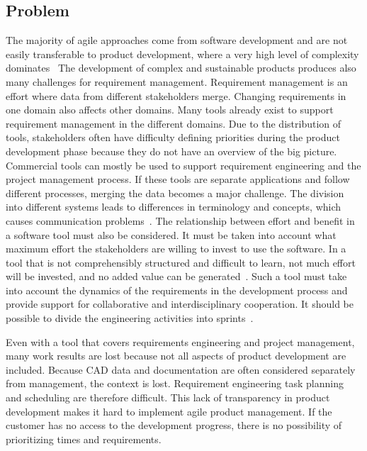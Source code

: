     
    
    \subsection*{Problem}
    The majority of agile approaches come from software development and are not easily transferable to product development, where a very high level of complexity dominates~\cite{HEIMICKE2021786}
    The development of complex and sustainable products produces also many challenges for requirement management. Requirement management is an effort where data from different stakeholders merge. 
    Changing requirements in one domain also affects other domains. Many tools already exist to support requirement management in the different domains. Due to the distribution of tools, stakeholders often have difficulty defining priorities during the product development phase because they do not have an overview of the big picture. Commercial tools can mostly be used to support requirement engineering and the project management process. If these tools are separate applications and follow different processes, merging the data becomes a major challenge. The division into different systems leads to differences in terminology and concepts, which causes communication problems~\cite{Jorma2014}.
    The relationship between effort and benefit in a software tool must also be considered. It must be taken into account what maximum effort the stakeholders are willing to invest to use the software. In a tool that is not comprehensibly structured and difficult to learn, not much effort will be invested, and no added value can be generated~\cite{RICHTER2020271}.
    Such a tool must take into account the dynamics of the requirements in the development process and provide support for collaborative and interdisciplinary cooperation. It should be possible to divide the engineering activities into sprints~\cite{liu2012scenario}.

    

    Even with a tool that covers requirements engineering and project management, many work results are lost because not all aspects of product development are included. Because CAD data and documentation are often considered separately from management, the context is lost. 
    Requirement engineering task planning and scheduling are therefore difficult.
    This lack of transparency in product development makes it hard to implement agile product management. If the customer has no access to the development progress, there is no possibility of prioritizing times and requirements. 

